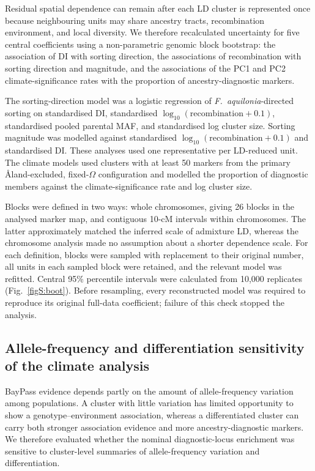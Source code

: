 \documentclass[11pt]{article}
\newcommand{\Faq}{\textit{F.~aquilonia}}
\begin{document}
Residual spatial dependence can remain after each LD cluster is represented
once because neighbouring units may share ancestry tracts, recombination
environment, and local diversity. We therefore recalculated uncertainty for
five central coefficients using a non-parametric genomic block bootstrap:
the association of DI with sorting direction, the associations of
recombination with sorting direction and magnitude, and the associations of
the PC1 and PC2 climate-significance rates with the proportion of
ancestry-diagnostic markers.

The sorting-direction model was a logistic regression of \Faq-directed sorting
on standardised DI, standardised
\(\log_{10}(\mathrm{recombination}+0.1)\), standardised pooled parental MAF,
and standardised log cluster size. Sorting magnitude was modelled against
standardised \(\log_{10}(\mathrm{recombination}+0.1)\) and standardised DI.
These analyses used one representative per LD-reduced unit. The climate models
used clusters with at least 50 markers from the primary
\AA{}land-excluded, fixed-\(\Omega\) configuration and modelled the proportion
of diagnostic members against the climate-significance rate and log cluster
size.

Blocks were defined in two ways: whole chromosomes, giving 26 blocks in the
analysed marker map, and contiguous 10-cM intervals within chromosomes. The
latter approximately matched the inferred scale of admixture LD, whereas the
chromosome analysis made no assumption about a shorter dependence scale. For
each definition, blocks were sampled with replacement to their original
number, all units in each sampled block were retained, and the relevant model
was refitted. Central 95\% percentile intervals were calculated from 10,000
replicates (Fig.~\ref{figS:boot}). Before resampling, every reconstructed model was required to
reproduce its original full-data coefficient; failure of this check stopped
the analysis.

\subsection{Allele-frequency and differentiation sensitivity of the climate analysis}

BayPass evidence depends partly on the amount of allele-frequency variation
among populations. A cluster with little variation has limited opportunity to
show a genotype--environment association, whereas a differentiated cluster can
carry both stronger association evidence and more ancestry-diagnostic markers.
We therefore evaluated whether the nominal diagnostic-locus enrichment was
sensitive to cluster-level summaries of allele-frequency variation and
differentiation.
\end{document}
